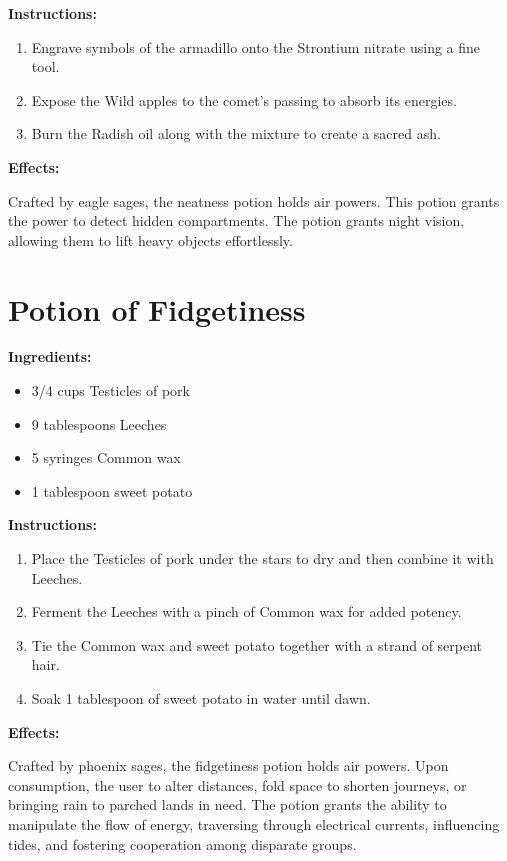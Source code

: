 \documentclass{article}
\begin{document}
\textbf{Instructions:}

\begin{enumerate}
  \item Engrave symbols of the armadillo onto the Strontium nitrate using a fine tool.
  \item Expose the Wild apples to the comet’s passing to absorb its energies.
  \item Burn the Radish oil along with the mixture to create a sacred ash.
\end{enumerate}

\textbf{Effects:}

Crafted by eagle sages, the neatness potion holds air powers. This potion grants the power to detect hidden compartments. The potion grants night vision, allowing them to lift heavy objects effortlessly.

\newpage
\section*{Potion of Fidgetiness}

\textbf{Ingredients:}

\begin{itemize}
  \item 3/4 cups Testicles of pork
  \item 9 tablespoons Leeches
  \item 5 syringes Common wax
  \item 1 tablespoon sweet potato
\end{itemize}

\textbf{Instructions:}

\begin{enumerate}
  \item Place the Testicles of pork under the stars to dry and then combine it with Leeches.
  \item Ferment the Leeches with a pinch of Common wax for added potency.
  \item Tie the Common wax and sweet potato together with a strand of serpent hair.
  \item Soak 1 tablespoon of sweet potato in water until dawn.
\end{enumerate}

\textbf{Effects:}

Crafted by phoenix sages, the fidgetiness potion holds air powers. Upon consumption, the user to alter distances, fold space to shorten journeys, or bringing rain to parched lands in need. The potion grants the ability to manipulate the flow of energy, traversing through electrical currents, influencing tides, and fostering cooperation among disparate groups.
\end{document}
